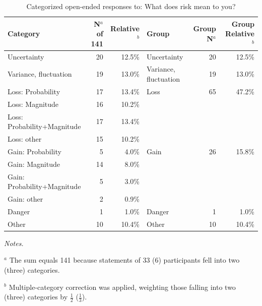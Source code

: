 \documentclass[a4paper,man, natbib,floatsintext]{apa6} %
\begin{document}
\begin{table}
\centering
\begin{threeparttable}
\caption{Categorized open-ended responses to: What does risk mean to you?}
\small
\label{table:QualRisk1}
\begin{tabular}[12cm]{lrrlrr}
Category & N$^a$ of 141 & Relative$^b$ & Group & Group N$^a$ & Group Relative$^b$ \\ 
  \midrule
Uncertainty &  20 & 12.5\% & Uncertainty &  20 & 12.5\% \\ 
  Variance, fluctuation &  19 & 13.0\% & Variance, fluctuation &  19 & 13.0\% \\ 
  Loss: Probability &  17 & 13.4\% & Loss &  65 & 47.2\% \\ 
  Loss: Magnitude &  16 & 10.2\% &  &  &  \\ 
  Loss: Probability+Magnitude &  17 & 13.4\% &  &  &  \\ 
  Loss: other &  15 & 10.2\% &  &  &  \\ 
  Gain: Probability &   5 & 4.0\% & Gain &  26 & 15.8\% \\ 
  Gain: Magnitude &  14 & 8.0\% &  &  &  \\ 
  Gain: Probability+Magnitude &   5 & 3.0\% &  &  &  \\ 
  Gain: other &   2 & 0.9\% &  &  &  \\ 
  Danger &   1 & 1.0\% & Danger &   1 & 1.0\% \\ 
  Other &  10 & 10.4\% & Other &  10 & 10.4\% \\ 
   \bottomrule
\end{tabular}

\begin{tablenotes}
\renewcommand{\TPTminimum}{\linewidth}
\def\tnote#1{\protect\TPToverlap{\TPTtagStyle{#1}}}%
\small
\textit{Notes.}\\
    \item[$^a$] The sum equals 141 because statements of 33 (6) participants fell into two (three) categories.\\
    \item[$^b$] Multiple-category correction was applied, weighting those falling into two (three) categories by $\frac{1}{2}$ ($\frac{1}{3}$).

\end{tablenotes}
\end{threeparttable}
\end{table}
\end{document}
